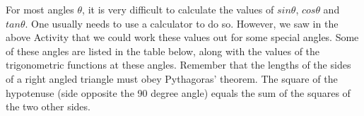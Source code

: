 \begin{enumerate}[noitemsep, label=\textbf{\arabic*}. ]
\begin{figure}[H]
\begin{center}
      \vspace{2pt}
    \vspace{.1in}
    \end{center}
 \end{figure}       \label{m39408*id80598}\nopagebreak\noindent{}
    \end{enumerate}
      \label{m39408*id80673}For most angles \begin{math}\theta \end{math}, it is very difficult to calculate the values of \begin{math}sin\theta \end{math}, \begin{math}cos\theta \end{math} and \begin{math}tan\theta \end{math}. One usually needs to use a calculator to do so. However, we saw in the above Activity that we could work these values out for some special angles. Some of these angles are listed in the table below, along with the values of the trigonometric functions at these angles. Remember that the lengths of the sides of a right angled triangle must obey Pythagoras' theorem. The square of the hypotenuse (side opposite the 90 degree angle) equals the sum of the squares of the two other sides.\par 
